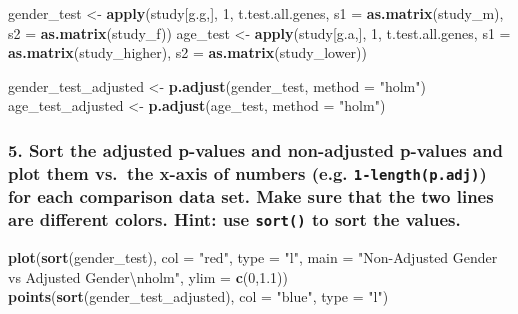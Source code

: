 \documentclass[]{article}
\newenvironment{Shaded}{\begin{snugshade}}{\end{snugshade}}
\newcommand{\KeywordTok}[1]{\textcolor[rgb]{0.13,0.29,0.53}{\textbf{{#1}}}}
\newcommand{\DataTypeTok}[1]{\textcolor[rgb]{0.13,0.29,0.53}{{#1}}}
\newcommand{\DecValTok}[1]{\textcolor[rgb]{0.00,0.00,0.81}{{#1}}}
\newcommand{\FloatTok}[1]{\textcolor[rgb]{0.00,0.00,0.81}{{#1}}}
\newcommand{\CharTok}[1]{\textcolor[rgb]{0.31,0.60,0.02}{{#1}}}
\newcommand{\StringTok}[1]{\textcolor[rgb]{0.31,0.60,0.02}{{#1}}}
\newcommand{\NormalTok}[1]{{#1}}
\begin{document}
\begin{Shaded}
\begin{Highlighting}[]
\NormalTok{gender_test <-}\StringTok{ }\KeywordTok{apply}\NormalTok{(study[g.g,], }\DecValTok{1}\NormalTok{, t.test.all.genes, }\DataTypeTok{s1 =} \KeywordTok{as.matrix}\NormalTok{(study_m), }\DataTypeTok{s2 =} \KeywordTok{as.matrix}\NormalTok{(study_f))}
\NormalTok{age_test <-}\StringTok{ }\KeywordTok{apply}\NormalTok{(study[g.a,], }\DecValTok{1}\NormalTok{, t.test.all.genes, }\DataTypeTok{s1 =} \KeywordTok{as.matrix}\NormalTok{(study_higher), }\DataTypeTok{s2 =} \KeywordTok{as.matrix}\NormalTok{(study_lower))}

\NormalTok{gender_test_adjusted <-}\StringTok{ }\KeywordTok{p.adjust}\NormalTok{(gender_test, }\DataTypeTok{method =} \StringTok{"holm"}\NormalTok{)}
\NormalTok{age_test_adjusted <-}\StringTok{ }\KeywordTok{p.adjust}\NormalTok{(age_test, }\DataTypeTok{method =} \StringTok{"holm"}\NormalTok{)}
\end{Highlighting}
\end{Shaded}

\subsubsection{\texorpdfstring{5. Sort the adjusted p-values and
non-adjusted p-values and plot them vs.~the x-axis of numbers (e.g.
\texttt{1-length(p.adj)}) for each comparison data set. Make sure that
the two lines are different colors. Hint: use \texttt{sort()} to sort
the
values.}{5. Sort the adjusted p-values and non-adjusted p-values and plot them vs.~the x-axis of numbers (e.g. 1-length(p.adj)) for each comparison data set. Make sure that the two lines are different colors. Hint: use sort() to sort the values.}}\label{sort-the-adjusted-p-values-and-non-adjusted-p-values-and-plot-them-vs.the-x-axis-of-numbers-e.g.-1-lengthp.adj-for-each-comparison-data-set.-make-sure-that-the-two-lines-are-different-colors.-hint-use-sort-to-sort-the-values.}

\begin{Shaded}
\begin{Highlighting}[]
\KeywordTok{plot}\NormalTok{(}\KeywordTok{sort}\NormalTok{(gender_test), }\DataTypeTok{col =} \StringTok{"red"}\NormalTok{, }\DataTypeTok{type =} \StringTok{"l"}\NormalTok{, }
     \DataTypeTok{main =} \StringTok{"Non-Adjusted Gender vs Adjusted Gender}\CharTok{\textbackslash{}n}\StringTok{holm"}\NormalTok{, }\DataTypeTok{ylim =} \KeywordTok{c}\NormalTok{(}\DecValTok{0}\NormalTok{,}\FloatTok{1.1}\NormalTok{))}
\KeywordTok{points}\NormalTok{(}\KeywordTok{sort}\NormalTok{(gender_test_adjusted), }\DataTypeTok{col =} \StringTok{"blue"}\NormalTok{, }\DataTypeTok{type =} \StringTok{"l"}\NormalTok{)}
\end{Highlighting}
\end{Shaded}
\end{document}
